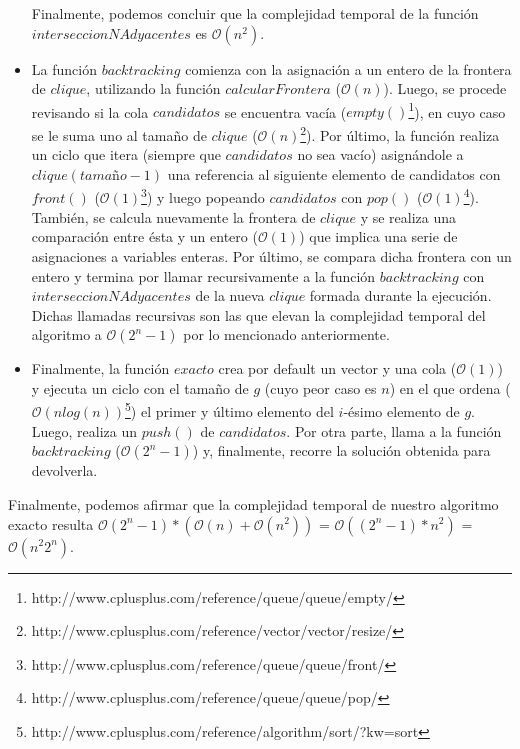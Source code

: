 \begin{itemize}
\newline
Finalmente, podemos concluir que la complejidad temporal de la función $interseccionNAdyacentes$ es $\mathcal{O}(n^2)$.
\item La función $backtracking$ comienza con la asignación a un entero de la frontera de $clique$, utilizando la función $calcularFrontera$ ($\mathcal{O}(n)$).\newline
\newline
Luego, se procede revisando si la cola $candidatos$ se encuentra vacía ($empty()$\footnote{http://www.cplusplus.com/reference/queue/queue/empty/}), en cuyo caso se le suma uno al tamaño de $clique$ ($\mathcal{O}(n)$\footnote{http://www.cplusplus.com/reference/vector/vector/resize/}).\newline
\newline
Por último, la función realiza un ciclo que itera (siempre que $candidatos$ no sea vacío) asignándole a $clique(tamaño-1)$ una referencia al siguiente elemento de candidatos con $front()$ ($\mathcal{O}(1)$\footnote{http://www.cplusplus.com/reference/queue/queue/front/}) y luego popeando $candidatos$ con $pop()$ ($\mathcal{O}(1)$\footnote{http://www.cplusplus.com/reference/queue/queue/pop/}). También, se calcula nuevamente la frontera de $clique$ y se realiza una comparación entre ésta y un entero ($\mathcal{O}(1)$) que implica una serie de asignaciones a variables enteras. Por último, se compara dicha frontera con un entero y termina por llamar recursivamente a la función $backtracking$ con $interseccionNAdyacentes$ de la nueva $clique$ formada durante la ejecución. Dichas llamadas recursivas son las que elevan la complejidad temporal del algoritmo a $\mathcal{O}(2^n - 1)$ por lo mencionado anteriormente.
\item Finalmente, la función $exacto$ crea por default un vector y una cola ($\mathcal{O}(1)$) y ejecuta un ciclo con el tamaño de $g$ (cuyo peor caso es $n$) en el que ordena ($\mathcal{O}(nlog(n))$\footnote{http://www.cplusplus.com/reference/algorithm/sort/?kw=sort})
el primer y último elemento del $i$-ésimo elemento de $g$. Luego, realiza un $push()$ de $candidatos$.\newline
\newline
Por otra parte, llama a la función $backtracking$ ($\mathcal{O}(2^n - 1)$) y, finalmente, recorre la solución obtenida para devolverla.
\end{itemize}

Finalmente, podemos afirmar que la complejidad temporal de nuestro algoritmo exacto resulta $\mathcal{O}(2^n - 1) * (\mathcal{O}(n) + \mathcal{O}(n^2))$ = $\mathcal{O}((2^n - 1) * n^{2})$ = $\mathcal{O}(n^{2} 2^n)$.

